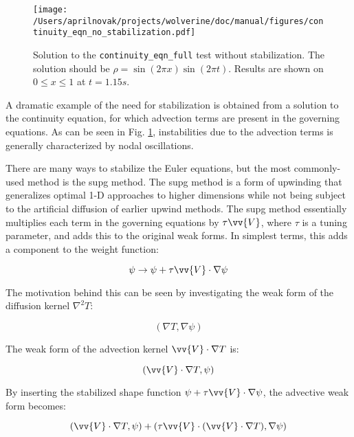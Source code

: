\documentclass[10pt]{article}
\numberwithin{equation}{section} %
\begin{document}
\begin{figure}[H]
  \centering
  \texttt{[image: /Users/aprilnovak/projects/wolverine/doc/manual/figures/continuity\_eqn\_no\_stabilization.pdf]}
  \caption{Solution to the \texttt{continuity\_eqn\_full} test without stabilization. The solution should be \(\rho=\sin{(2\pi x)}\sin{(2\pi t)}\). Results are shown on \(0\leq x\leq 1\) at \(t=1.15 s\).}
  \label{fig:continuity_eqn_no_stabilization}
\end{figure}

A dramatic example of the need for stabilization is obtained from a solution to the continuity equation, for which advection terms are present in the governing equations. As can be seen in Fig. \ref{fig:continuity_eqn_no_stabilization}, instabilities due to the advection terms is generally characterized by nodal oscillations. 

There are many ways to stabilize the Euler equations, but the most commonly-used method is the \gls{supg} method. The \gls{supg} method is a form of upwinding that generalizes optimal 1-D approaches to higher dimensions while not being subject to the artificial diffusion of earlier upwind methods. The \gls{supg} method essentially multiplies each term in the governing equations by \(\tau\vv{V}\), where \(\tau\) is a tuning parameter, and adds this to the original weak forms. In simplest terms, this adds a component to the weight function:

\begin{equation}
\label{eq:SUPGPsi}
\psi\rightarrow\psi+\tau\vv{V}\cdot\nabla\psi
\end{equation}

The motivation behind this can be seen by investigating the weak form of the diffusion kernel \(\nabla^2 T\):

\begin{equation}
\label{eq:DiffusionWeakForm}
(\nabla T, \nabla\psi)
\end{equation}

The weak form of the advection kernel \(\vv{V}\cdot\nabla T\) is:

\begin{equation}
\label{eq:AdvectiveWeakForm}
(\vv{V}\cdot\nabla T,\psi)
\end{equation}

By inserting the stabilized shape function \(\psi+\tau\vv{V}\cdot\nabla\psi\), the advective weak form becomes:

\begin{equation}
\label{eq:AdvectiveWeakForm2}
(\vv{V}\cdot\nabla T,\psi)+(\tau\vv{V}\cdot(\vv{V}\cdot\nabla T),\nabla\psi)
\end{equation}
\end{document}
